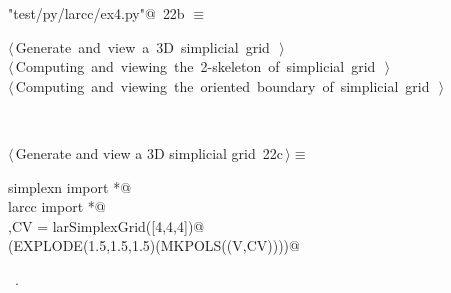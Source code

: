 \documentclass[11pt,oneside]{article}	%
\begin{document}
\begin{flushleft} \small
\begin{minipage}{\linewidth} \label{scrap51}
\protect{}\verb@"test/py/larcc/ex4.py"@\nobreak\ {\footnotesize 22b }$\equiv$
\vspace{-1ex}
\begin{list}{}{} \item
\mbox{}\verb@@\hbox{$\langle\,$Generate and view a 3D simplicial grid\nobreak\ {\footnotesize {}}$\,\rangle$}\verb@@\\
\mbox{}\verb@@\hbox{$\langle\,$Computing and viewing the 2-skeleton of simplicial grid\nobreak\ {\footnotesize {}}$\,\rangle$}\verb@@\\
\mbox{}\verb@@\hbox{$\langle\,$Computing and viewing the oriented boundary of simplicial grid\nobreak\ {\footnotesize {}}$\,\rangle$}\verb@@\\
\mbox{}\verb@@{\NWsep}
\end{list}
\vspace{-2ex}
\end{minipage}\\[4ex]
\end{flushleft}


\begin{flushleft} \small
\begin{minipage}{\linewidth} \label{scrap52}
\protect{}$\langle\,$Generate and view a 3D simplicial grid\nobreak\ {\footnotesize 22c}$\,\rangle\equiv$
\vspace{-1ex}
\begin{list}{}{} \item
\mbox{}\verb@from simplexn import *@\\
\mbox{}\verb@from larcc import *@\\
\mbox{}\verb@V,CV = larSimplexGrid([4,4,4])@\\
\mbox{}\verb@VIEW(EXPLODE(1.5,1.5,1.5)(MKPOLS((V,CV))))@\\
\mbox{}\verb@@{\NWsep}
\end{list}
\vspace{-1ex}
\footnotesize\addtolength{\baselineskip}{-1ex}
\begin{list}{}{\setlength{\itemsep}{-\parsep}\setlength{\itemindent}{-\leftmargin}}
\item \NWtxtMacroRefIn\ .
\end{list}
\end{minipage}\\[4ex]
\end{flushleft}
\end{document}
